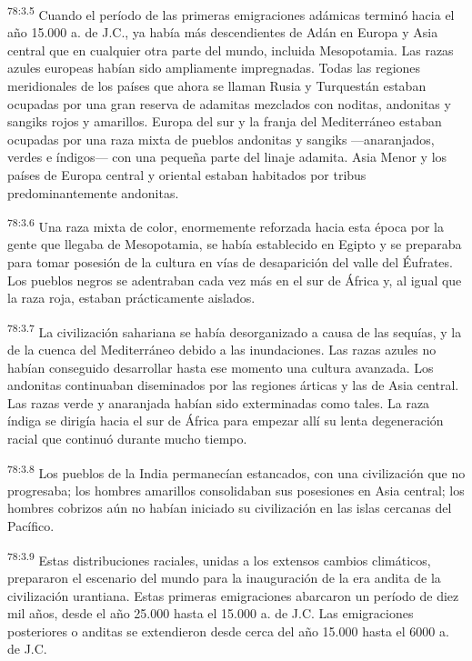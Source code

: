 \par
\textsuperscript{78:3.5} Cuando el período de las primeras emigraciones adámicas terminó hacia el año 15.000 a. de J.C., ya había más descendientes de Adán en Europa y Asia central que en cualquier otra parte del mundo, incluida Mesopotamia. Las razas azules europeas habían sido ampliamente impregnadas. Todas las regiones meridionales de los países que ahora se llaman Rusia y Turquestán estaban ocupadas por una gran reserva de adamitas mezclados con noditas, andonitas y sangiks rojos y amarillos. Europa del sur y la franja del Mediterráneo estaban ocupadas por una raza mixta de pueblos andonitas y sangiks ---anaranjados, verdes e índigos--- con una pequeña parte del linaje adamita. Asia Menor y los países de Europa central y oriental estaban habitados por tribus predominantemente andonitas.

\par
\textsuperscript{78:3.6} Una raza mixta de color, enormemente reforzada hacia esta época por la gente que llegaba de Mesopotamia, se había establecido en Egipto y se preparaba para tomar posesión de la cultura en vías de desaparición del valle del Éufrates. Los pueblos negros se adentraban cada vez más en el sur de África y, al igual que la raza roja, estaban prácticamente aislados.

\par
\textsuperscript{78:3.7} La civilización sahariana se había desorganizado a causa de las sequías, y la de la cuenca del Mediterráneo debido a las inundaciones. Las razas azules no habían conseguido desarrollar hasta ese momento una cultura avanzada. Los andonitas continuaban diseminados por las regiones árticas y las de Asia central. Las razas verde y anaranjada habían sido exterminadas como tales. La raza índiga se dirigía hacia el sur de África para empezar allí su lenta degeneración racial que continuó durante mucho tiempo.

\par
\textsuperscript{78:3.8} Los pueblos de la India permanecían estancados, con una civilización que no progresaba; los hombres amarillos consolidaban sus posesiones en Asia central; los hombres cobrizos aún no habían iniciado su civilización en las islas cercanas del Pacífico.

\par
\textsuperscript{78:3.9} Estas distribuciones raciales, unidas a los extensos cambios climáticos, prepararon el escenario del mundo para la inauguración de la era andita de la civilización urantiana. Estas primeras emigraciones abarcaron un período de diez mil años, desde el año 25.000 hasta el 15.000 a. de J.C. Las emigraciones posteriores o anditas se extendieron desde cerca del año 15.000 hasta el 6000 a. de J.C.

